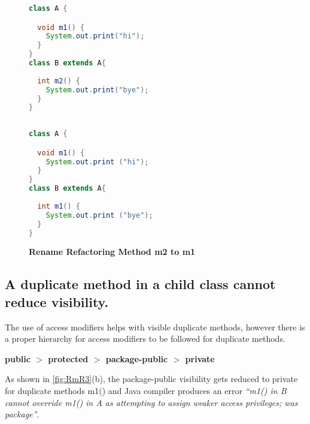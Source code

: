\begin{figure}[th]
\centering
\begin{minipage}[t]{0.47\linewidth}
\begin{lstlisting}[language=java, basicstyle=\scriptsize\ttfamily,frame=single]
class A {

  void m1() {
    System.out.print("hi");
  }
}
class B extends A{
 
  int m2() {
    System.out.print("bye");
  }	
}
 
\end{lstlisting}
\end{minipage}
\hfill
\begin{minipage}[t]{0.47\linewidth}
\begin{lstlisting}[language=java, basicstyle=\scriptsize\ttfamily,frame=single]
class A {

  void m1() {
    System.out.print ("hi");
  }
}
class B extends A{
 
  int m1() {
    System.out.print ("bye");
  }	
}

\end{lstlisting}
\end{minipage}
\caption{\textbf{Rename Refactoring Method m2 to m1}}
\label{fig:RmR2}
\end{figure}

\subsection{A duplicate method in a child class cannot reduce visibility.}

The use of access modifiers helps with visible duplicate methods, however there is a proper hierarchy for access modifiers to be followed for duplicate methods.


\begin{center}
\textbf{public $>$ protected $>$ package-public $>$ private}
\end{center}


As shown in \ref{fig:RmR3}(b), the package-public visibility gets reduced to private for duplicate methods m1() and Java compiler produces an error \textsl{``m1() in B cannot override m1() in A as attempting to assign weaker access privileges; was package''}. 

